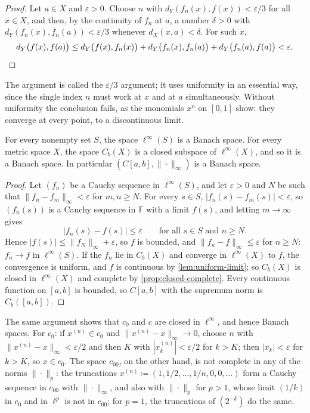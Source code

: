 \begin{proof}
Let $a\in X$ and $\varepsilon>0$. Choose $n$ with $d_Y(f_n(x),f(x))<\varepsilon/3$ for all $x\in X$, and then, by the continuity of $f_n$ at $a$, a number $\delta>0$ with $d_Y(f_n(x),f_n(a))<\varepsilon/3$ whenever $d_X(x,a)<\delta$. For such $x$,
\[
d_Y\bigl(f(x),f(a)\bigr)\le d_Y\bigl(f(x),f_n(x)\bigr)+d_Y\bigl(f_n(x),f_n(a)\bigr)+d_Y\bigl(f_n(a),f(a)\bigr)<\varepsilon .\qedhere
\]
\end{proof}

The argument is called the $\varepsilon/3$ argument; it uses uniformity in an essential way, since the single index $n$ must work at $x$ and at $a$ simultaneously. Without uniformity the conclusion fails, as the monomials $x^n$ on $[0,1]$ show: they converge at every point, to a discontinuous limit.

\begin{theorem}
\label{thm:bounded-functions-complete}
For every nonempty set $S$, the space $\ell^\infty(S)$ is a Banach space. For every metric space $X$, the space $C_b(X)$ is a closed subspace of $\ell^\infty(X)$, and so it is a Banach space. In particular $(C[a,b],\|\cdot\|_\infty)$ is a Banach space.
\end{theorem}

\begin{proof}
Let $(f_n)$ be a Cauchy sequence in $\ell^\infty(S)$, and let $\varepsilon>0$ and $N$ be such that $\|f_n-f_m\|_\infty<\varepsilon$ for $m,n\ge N$. For every $s\in S$, $|f_n(s)-f_m(s)|<\varepsilon$, so $(f_n(s))$ is a Cauchy sequence in $\mathbb F$ with a limit $f(s)$, and letting $m\to\infty$ gives
\[
|f_n(s)-f(s)|\le\varepsilon\qquad\text{for all }s\in S\text{ and }n\ge N .
\]
Hence $|f(s)|\le\|f_N\|_\infty+\varepsilon$, so $f$ is bounded, and $\|f_n-f\|_\infty\le\varepsilon$ for $n\ge N$: $f_n\to f$ in $\ell^\infty(S)$. If the $f_n$ lie in $C_b(X)$ and converge in $\ell^\infty(X)$ to $f$, the convergence is uniform, and $f$ is continuous by \cref{lem:uniform-limit}; so $C_b(X)$ is closed in $\ell^\infty(X)$ and complete by \cref{prop:closed-complete}. Every continuous function on $[a,b]$ is bounded, so $C[a,b]$ with the supremum norm is $C_b([a,b])$.
\end{proof}

The same argument shows that $c_0$ and $c$ are closed in $\ell^\infty$, and hence Banach spaces. For $c_0$: if $x^{(n)}\in c_0$ and $\|x^{(n)}-x\|_\infty\to0$, choose $n$ with $\|x^{(n)}-x\|_\infty<\varepsilon/2$ and then $K$ with $|x^{(n)}_k|<\varepsilon/2$ for $k>K$; then $|x_k|<\varepsilon$ for $k>K$, so $x\in c_0$. The space $c_{00}$, on the other hand, is not complete in any of the norms $\|\cdot\|_p$: the truncations $x^{(n)}\coloneqq(1,1/2,\ldots,1/n,0,0,\ldots)$ form a Cauchy sequence in $c_{00}$ with $\|\cdot\|_\infty$, and also with $\|\cdot\|_p$ for $p>1$, whose limit $(1/k)$ in $c_0$ and in $\ell^p$ is not in $c_{00}$; for $p=1$, the truncations of $(2^{-k})$ do the same.

